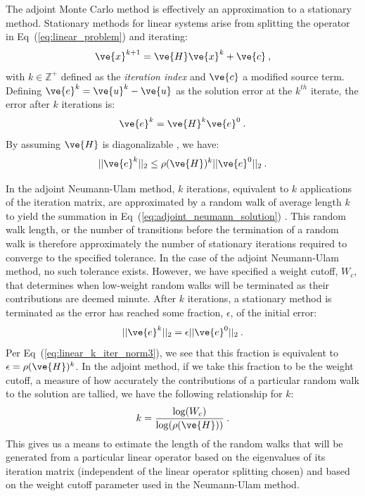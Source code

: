 \documentclass[preprint,11pt]{elsarticle}
\begin{document}
The adjoint Monte Carlo method is effectively an approximation to a
stationary method. Stationary methods for linear systems arise from
splitting the operator in Eq~(\ref{eq:linear_problem}) and iterating:
\begin{equation}
  \ve{x}^{k+1} = \ve{H}\ve{x}^k + \ve{c}\:,
  \label{eq:linear_iterative_method}
\end{equation}
with $k \in \mathbb{Z}^+$ defined as the \textit{iteration index} and $\ve{c}$
a modified source term. Defining $\ve{e}^k = \ve{u}^k - \ve{u}$ as the
solution error at the $k^{th}$ iterate, the error after $k$ iterations is:
\begin{equation}
  \ve{e}^{k} = \ve{H}^k\ve{e}^0\:. 
  \label{eq:linear_k_iter_error}
\end{equation}
By assuming $\ve{H}$ is diagonalizable \cite{leveque_finite_2007}, we have:
\begin{equation}
  ||\ve{e}^{k}||_2 \leq \rho(\ve{H})^k ||\ve{e}^0||_2\:.
  \label{eq:linear_k_iter_norm3}
\end{equation}

In the adjoint Neumann-Ulam method, $k$ iterations, equivalent to $k$
applications of the iteration matrix, are approximated by a random walk of
average length $k$ to yield the summation in
Eq~(\ref{eq:adjoint_neumann_solution})
\cite{dimov_new_1998,danilov_asymptotic_2000}. This random walk length, or the
number of transitions before the termination of a random walk is therefore
approximately the number of stationary iterations required to converge to the
specified tolerance. In the case of the adjoint Neumann-Ulam method, no such
tolerance exists. However, we have specified a weight cutoff, $W_c$, that
determines when low-weight random walks will be terminated as their
contributions are deemed minute. After $k$ iterations, a stationary method is
terminated as the error has reached some fraction, $\epsilon$, of the initial
error:
\begin{equation}
  ||\ve{e}^{k}||_2 = \epsilon ||\ve{e}^0||_2\:.
  \label{eq:linear_k_iter_norm4}
\end{equation}
Per Eq~(\ref{eq:linear_k_iter_norm3}), we see that this fraction is equivalent
to $\epsilon = \rho(\ve{H})^k$. In the adjoint method, if we take this
fraction to be the weight cutoff, a measure of how accurately the
contributions of a particular random walk to the solution are tallied, we have
the following relationship for $k$:
\begin{equation}
  k = \frac{ \log(W_c) }{ \log( \rho(\ve{H}) ) }\:.
  \label{eq:analytic_k}
\end{equation}
This gives us a means to estimate the length of the random walks that will be
generated from a particular linear operator based on the eigenvalues of its
iteration matrix (independent of the linear operator splitting chosen) and
based on the weight cutoff parameter used in the Neumann-Ulam method.
\end{document}
